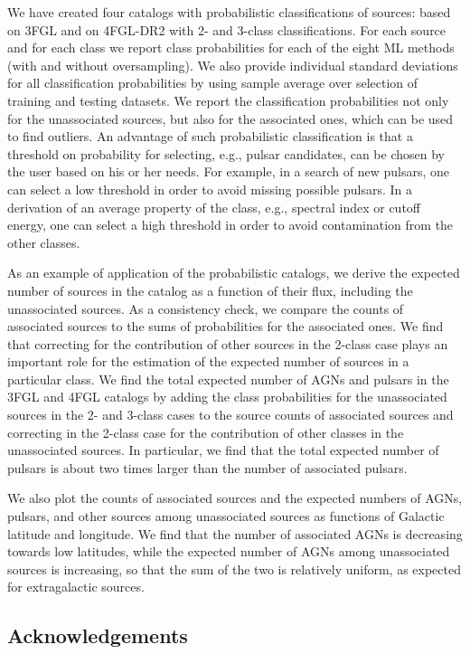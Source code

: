 We have created four catalogs with probabilistic classifications of sources: based on 3FGL and on 4FGL-DR2 with 2- and 3-class classifications.
For each source and for each class we report class probabilities for each of the eight ML methods (with and without oversampling). 
We also provide individual standard deviations for all classification probabilities by using sample average over selection of training and testing datasets.
We report the classification probabilities not only for the unassociated sources, but also for the associated ones, which can be used to find outliers.
An advantage of such probabilistic classification is that a threshold on probability for selecting, e.g., pulsar candidates, can be chosen by the user based on his or her needs.
For example, in a search of new pulsars, one can select a low threshold in order to avoid missing possible pulsars.
In a derivation of an average property of the class, e.g., spectral index or cutoff energy, one can select a high threshold in order to avoid contamination from the other classes.


As an example of application of the probabilistic catalogs, we derive the expected number of sources in the catalog as a function of their flux, including the unassociated sources.
As a consistency check, we compare the counts of associated sources to the sums of probabilities for the associated ones.
We find that correcting for the contribution of other sources in the 2-class case plays an important role for the estimation of the expected number of sources in a particular class.
We find the total expected number of AGNs and pulsars in the 3FGL and 4FGL catalogs by adding the class probabilities for the unassociated sources in the 2- and 3-class cases to the source counts of associated sources and correcting in the 2-class case for the contribution of other classes in the unassociated sources.
In particular, we find that the total expected number of pulsars is about two times larger than the number of associated pulsars.

We also plot the counts of associated sources and the expected numbers of AGNs, pulsars, and other sources among unassociated sources
as functions of Galactic latitude and longitude.
We find that the number of associated AGNs is decreasing towards low latitudes, while the expected number of AGNs among unassociated sources is increasing, so that the sum of the two is relatively uniform, as expected for extragalactic sources.


\subsection*{Acknowledgements}

